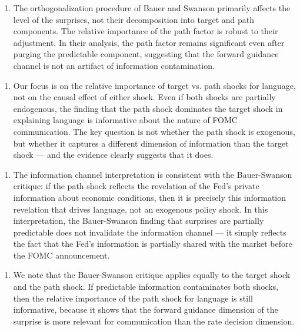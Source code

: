 \documentclass[12pt]{article}
\begin{document}
\begin{enumerate}
\item The orthogonalization procedure of Bauer and Swanson primarily affects the level of the surprises, not their decomposition into target and path components. The relative importance of the path factor is robust to their adjustment. In their analysis, the path factor remains significant even after purging the predictable component, suggesting that the forward guidance channel is not an artifact of information contamination.
\end{enumerate}

\begin{enumerate}
\item Our focus is on the relative importance of target vs. path shocks for language, not on the causal effect of either shock. Even if both shocks are partially endogenous, the finding that the path shock dominates the target shock in explaining language is informative about the nature of FOMC communication. The key question is not whether the path shock is exogenous, but whether it captures a different dimension of information than the target shock --- and the evidence clearly suggests that it does.
\end{enumerate}

\begin{enumerate}
\item The information channel interpretation is consistent with the Bauer-Swanson critique: if the path shock reflects the revelation of the Fed's private information about economic conditions, then it is precisely this information revelation that drives language, not an exogenous policy shock. In this interpretation, the Bauer-Swanson finding that surprises are partially predictable does not invalidate the information channel --- it simply reflects the fact that the Fed's information is partially shared with the market before the FOMC announcement.
\end{enumerate}

\begin{enumerate}
\item We note that the Bauer-Swanson critique applies equally to the target shock and the path shock. If predictable information contaminates both shocks, then the relative importance of the path shock for language is still informative, because it shows that the forward guidance dimension of the surprise is more relevant for communication than the rate decision dimension.
\end{enumerate}
\end{document}
